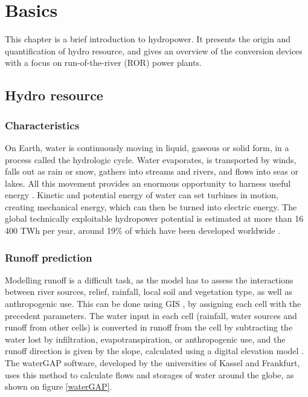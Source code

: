 \chapter{Basics}
\label{chap:basics}

This chapter is a brief introduction to hydropower. It presents the origin and quantification of hydro resource, and gives an overview of the conversion devices with a focus on run-of-the-river (ROR) power plants.

\section{Hydro resource}

\subsection{Characteristics}

On Earth, water is continuously moving in liquid, gaseous or solid form, in a process called the hydrologic cycle. Water evaporates, is transported by winds, falls out as rain or snow, gathers into streams and rivers, and flows into seas or lakes. All this movement provides an enormous opportunity to harness useful energy \cite{ucsusa}. Kinetic and potential energy of water can set turbines in motion, creating mechanical energy, which can then be turned into electric energy. The global technically exploitable hydropower potential is estimated at more than 16 400 TWh per year, around 19\% of which have been developed worldwide \cite{iea_hp_ess}.
 
\subsection{Runoff prediction}
 
Modelling runoff is a difficult task, as the model has to assess the interactions between river sources, relief, rainfall, local soil and vegetation type, as well as anthropogenic use. This can be done using GIS \cite{bayazit}, by assigning each cell with the precedent parameters. The water input in each cell (rainfall, water sources and runoff from other cells) is converted in runoff from the cell by subtracting the water lost by infiltration, evapotranspiration, or anthropogenic use, and the runoff direction is given by the slope, calculated using a digital elevation model \cite{heywood}. \newline
The waterGAP software, developed by the universities of Kassel and Frankfurt, uses this method to calculate flows and storages of water around the globe, as shown on figure \ref{waterGAP}.

